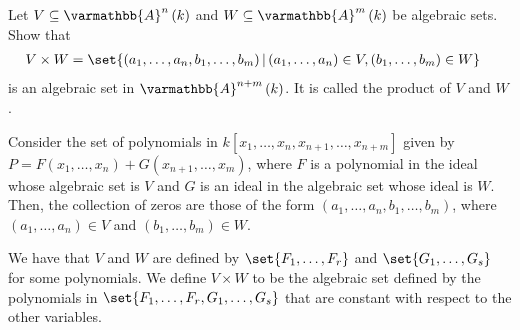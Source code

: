 \documentclass[10pt]{mypackage}
\renewcommand*{\mathbb}[1]{\varmathbb{#1}}
\newcommand{\A}{\mathbb{A}}
\begin{document}
\begin{exercise}[Exercise 1.15]
Let $V\subseteq \A^n\left(k\right)$ and $W\subseteq \A^m\left(k\right)$ be algebraic sets. Show that
\begin{align*}
  V\times W &= \set{\left(a_1,\dots,a_n,b_1,\dots,b_m\right) | \left(a_1,\dots,a_n\right)\in V,\left(b_1,\dots,b_m\right)\in W}
\end{align*}
is an algebraic set in $\A^{n+m}\left(k\right)$. It is called the product of $V$ and $W$.
\end{exercise}
\begin{solution}
  Consider the set of polynomials in $k\left[x_1,\dots,x_n,x_{n+1},\dots,x_{n+m}\right]$ given by $P = F\left(x_1,\dots,x_n\right) + G\left(x_{n+1},\dots,x_m\right)$, where $F$ is a polynomial in the ideal whose algebraic set is $V$ and $G$ is an ideal in the algebraic set whose ideal is $W$. Then, the collection of zeros are those of the form $\left(a_1,\dots,a_n,b_1,\dots,b_m\right)$, where $\left(a_1,\dots,a_n\right)\in V$ and $\left(b_1,\dots,b_m\right)\in W$.
\end{solution}
\begin{solution}
  We have that $V$ and $W$ are defined by $\set{F_1,\dots,F_r}$ and $\set{G_1,\dots,G_s}$ for some polynomials. We define $V\times W$ to be the algebraic set defined by the polynomials in $\set{F_1,\dots,F_r,G_1,\dots,G_s}$ that are constant with respect to the other variables.
\end{solution}
\end{document}
